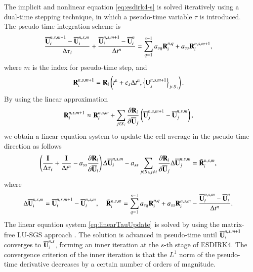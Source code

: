 {The implicit and nonlinear equation \eqref{eq:esdirk4-s} is solved iteratively using a dual-time stepping technique, in which a pseudo-time variable $\tau$ is introduced. The pseudo-time integration scheme is %
\begin{equation}
    \dfrac{\overline{\mathbf{U}}^{n,s,m+1}_i-\overline{\mathbf{U}}^{n,s,m}_i}{\mathrm\Delta \tau_i} + \dfrac{\overline{\mathbf{U}}^{n,s,m+1}_i - \overline{\mathbf{U}}^{n}_i}{\mathrm\Delta t^n} = \sum_{q=1}^{s-1} a_{sq} \mathbf{R}^{n,q}_i + a_{ss} \mathbf{R}_i^{n,s,m+1},
\end{equation}
where $m$ is the index for pseudo-time step, and
\begin{equation}
    \mathbf{R}^{n,s,m+1}_i  = \mathbf{R}_i \left(t^n + c_s \mathrm\Delta t^n, \left\{\mathbf{U}^{n,s,m+1}_j\right\}_{j \in S_i}\right).
\end{equation}
By using the linear approximation
\begin{equation}
    \mathbf{R}^{n,s,m+1}_i \approx \mathbf{R}^{n,s,m}_i + \sum_{j \in S_i} \dfrac{\partial \mathbf{R}_i}{\partial \overline{\mathbf{U}}_j} \left(\overline{\mathbf{U}}^{n,s,m+1}_j-\overline{\mathbf{U}}^{n,s,m}_j\right),
\end{equation}
we obtain a linear equation system to update the cell-average in the pseudo-time direction as follows
\begin{equation}
    \left(\frac{\eye}{\inc \tau_i} + \frac{\eye}{\inc t^n} -a_{ss}\partialderivative{\R_i }{\uu_i} \right) \inc \uu^{n,s, m}_i
    -
    a_{ss}\sum_{j\in S_i,j\neq i} {
        \partialderivative{\R_i}{\uu_j} \inc \uu^{n,s, m}_j
    }
    = \tilde{\R}^{n,s,m}_i,
    \label{eq:linearTauUpdate}
\end{equation}
where
\begin{equation}
    \label{eq:define-inc}
    \mathrm\Delta \overline{\mathbf{U}}^{n,s,m}_i= \overline{\mathbf{U}}^{n,s,m + 1}_i - \overline{\mathbf{U}}^{n,s,m}_i, \quad \tilde{\mathbf{R}}^{n,s,m}_i= \sum_{q=1}^{s-1} a_{sq} \mathbf{R}^{n,q}_i + a_{ss} \mathbf{R}_i^{n,s,m} - \dfrac{\overline{\mathbf{U}}^{n,s,m}_i - \overline{\mathbf{U}}^{n}_i}{\mathrm\Delta t^n}.
\end{equation}
The linear equation system \eqref{eq:linearTauUpdate} is solved by using the matrix-free LU-SGS approach \cite{luo1998fast}. The solution is advanced in pseudo-time until $\overline{\mathbf{U}}^{n,s,m+1}_{i}$ converges to $\overline{\mathbf{U}}^{n,s}_{i}$, forming an inner iteration at the $s$-th stage of ESDIRK4. The convergence criterion of the inner iteration is that the $L^1$ norm of the pseudo-time derivative decreases by a certain number of orders of magnitude.
}

